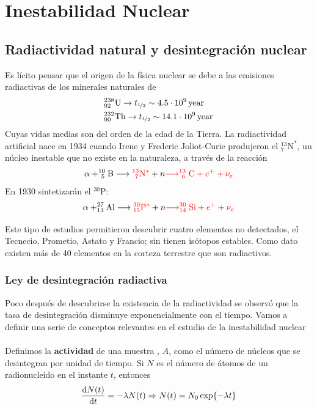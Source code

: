 \pagestyle{fancy}
\chapter{Inestabilidad Nuclear}

\section{Radiactividad natural y desintegración nuclear}
Es lícito pensar que el origen de la física nuclear se debe a las emisiones radiactivas de los minerales naturales de $$\begin{aligned}
    & ^{238} _{92} \mathrm{U} \xrightarrow{} t_\mathrm{\nicefrac{1}{2}}\sim \unit[4.5\cdot10^{9}]{year}\\
    &^{232} _{90} \mathrm{Th} \xrightarrow{} t_\mathrm{\nicefrac{1}{2}}\sim \unit[14.1\cdot10^{9}]{year}
\end{aligned}$$
Cuyas vidas medias son del orden de la edad de la Tierra.
La radiactividad artificial nace en 1934 cuando Irene y Frederic Joliot-Curie produjeron el $^{13} _7\mathrm{N}^*$, un núcleo inestable que no existe en la naturaleza, a través de la reacción
$$\alpha + ^{10} _{\ 5} \mathrm{B}\longrightarrow \textcolor{red}{^{13} _{\ 7}\mathrm{N}^*} +n \textcolor{red}{\longrightarrow ^{13} _{\ 6}\mathrm{C}+ e^++\nu_e}$$
En 1930 sintetizarán el $^{30}\mathrm{P}$: 
$$\alpha + ^{27} _{13} \mathrm{Al}\longrightarrow \textcolor{red}{^{30} _{15}\mathrm{P}^*} +n \textcolor{red}{\longrightarrow ^{30} _{14}\mathrm{Si}+ e^++\nu_e}$$

Este tipo de estudios permitieron descubrir cuatro elementos no detectados, el Tecnecio, Prometio, Astato y Francio; sin tienen isótopos estables. Como dato existen más de 40 elementos en la corteza terrestre que son radiactivos.

\subsection{Ley de desintegración radiactiva}
Poco después de descubrirse la existencia de la radiactividad se observó que la tasa de desintegración disminuye exponencialmente con el tiempo. Vamos a definir una serie de conceptos relevantes en el estudio de la inestabilidad nuclear\\\\
Definimos la \textbf{actividad} de una muestra , $A$, como el número de núcleos que se desintegran por unidad de tiempo. Si $N$ es el número de átomos de un radionucleido en el instante $t$, entonces 
\begin{equation}
    \dv{N(t)}{t}=-\lambda N(t) \Rightarrow N(t)=N_0\exp{-\lambda t}
    \label{eq: ley de desintegracion radiactiva}
\end{equation}


